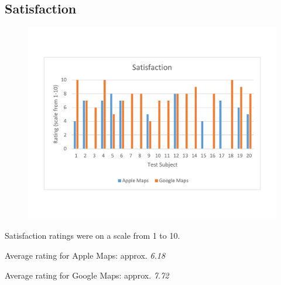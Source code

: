 \documentclass[a4paper; 11pt]{article}
\begin{document}
\subsection{Satisfaction}
\begin{figure}[ht]
\begin{center}
\includegraphics[keepaspectratio, width=.8\textwidth ]{satisfaction.pdf}
\end{center}
\end{figure}
\par
Satisfaction ratings were on a scale from 1 to 10.
\par
Average rating for Apple Maps: approx. \textit{6.18}
\par
Average rating for Google Maps: approx. \textit{7.72}
\end{document}
